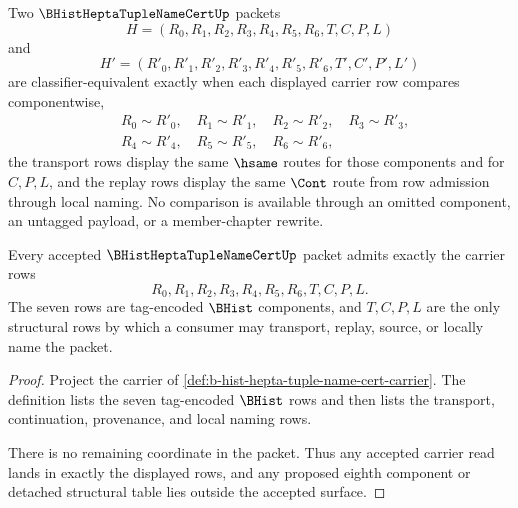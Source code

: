 \begin{definition}
\label{def:b-hist-hepta-tuple-name-cert-classifier}
Two $\BHistHeptaTupleNameCertUp$ packets
$$
H=(R_0,R_1,R_2,R_3,R_4,R_5,R_6,T,C,P,L)
$$
and
$$
H'=(R'_0,R'_1,R'_2,R'_3,R'_4,R'_5,R'_6,T',C',P',L')
$$
are classifier-equivalent exactly when each displayed carrier row compares componentwise,
$$
\begin{aligned}
&R_0 \sim R'_0,\quad R_1 \sim R'_1,\quad R_2 \sim R'_2,\quad R_3 \sim R'_3,\\
&R_4 \sim R'_4,\quad R_5 \sim R'_5,\quad R_6 \sim R'_6,
\end{aligned}
$$
the transport rows display the same $\hsame$ routes for those components and for $C,P,L$, and the replay rows display the same $\Cont$ route from row admission through local naming. No comparison is available through an omitted component, an untagged payload, or a member-chapter rewrite.
\end{definition}

\begin{theorem}
\label{thm:b-hist-hepta-tuple-name-cert-carrier-admission}
Every accepted $\BHistHeptaTupleNameCertUp$ packet admits exactly the carrier rows
$$
R_0,R_1,R_2,R_3,R_4,R_5,R_6,T,C,P,L.
$$
The seven rows are tag-encoded $\BHist$ components, and $T,C,P,L$ are the only structural rows by which a consumer may transport, replay, source, or locally name the packet.
\end{theorem}
\begin{proof}
Project the carrier of \autoref{def:b-hist-hepta-tuple-name-cert-carrier}. The definition lists the seven tag-encoded $\BHist$ rows and then lists the transport, continuation, provenance, and local naming rows.

There is no remaining coordinate in the packet. Thus any accepted carrier read lands in exactly the displayed rows, and any proposed eighth component or detached structural table lies outside the accepted surface.
\end{proof}

